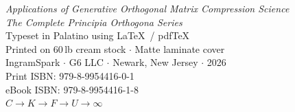 \documentclass[11pt, twoside, openright]{book}
\theoremstyle{plain}
\theoremstyle{definition}
\begin{document}
\cleardoublepage
\thispagestyle{empty}
\begin{center}
\vfill
{\small
\textit{Applications of Generative Orthogonal Matrix Compression Science}\\
\textit{The Complete Principia Orthogona Series}\\[6pt]
Typeset in Palatino using \LaTeX\ / pdfTeX\\
Printed on 60\,lb cream stock $\cdot$ Matte laminate cover\\
IngramSpark $\cdot$ G6 LLC $\cdot$ Newark, New Jersey $\cdot$ 2026\\[6pt]
Print ISBN: 979-8-9954416-0-1\\
eBook ISBN: 979-8-9954416-1-8\\[6pt]
$C \longrightarrow K \longrightarrow F \longrightarrow U \longrightarrow \infty$
}
\vfill
\end{center}
\end{document}
